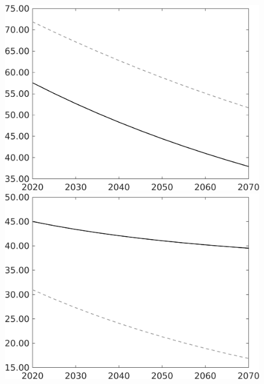 \documentclass[12pt]{article}
\begin{document}
\begin{figure}
\begin{minipage}[]{0.32\textwidth}
	\end{minipage}
	\begin{minipage}[]{0.32\textwidth}
		\includegraphics[width=1\textwidth]{../../codding_model/own_basedOnFried/optimalPol_010922_revision/figures/all_13Sept22/LevTaufNoTauf_TaulCalib_regime0_gAf_spillover0_nsk1_xgr0_knspil1_sep1_LFlimit0_emsbase0_countec0_GovRev0_etaa0.79_lgd0.png}
	\end{minipage}
	\begin{minipage}[]{0.32\textwidth}
		\includegraphics[width=1\textwidth]{../../codding_model/own_basedOnFried/optimalPol_010922_revision/figures/all_13Sept22/LevTaufNoTauf_TaulCalib_regime0_gAg_spillover0_nsk1_xgr0_knspil1_sep1_LFlimit0_emsbase0_countec0_GovRev0_etaa0.79_lgd0.png}

\end{minipage}
\end{figure}
\end{document}
